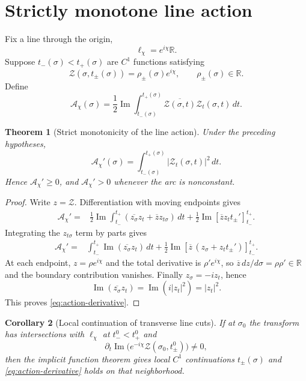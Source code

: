 \documentclass[11pt]{amsart}
\numberwithin{equation}{section}
\newtheorem{theorem}{Theorem}[section]
\newtheorem{corollary}[theorem]{Corollary}
\newcommand{\R}{\mathbb R}
\newcommand{\Zcal}{\mathcal Z}
\newcommand{\Acal}{\mathscr A}
\newcommand{\dd}{\,d}
\begin{document}
\section{Strictly monotone line action}

Fix a line through the origin,
\[
\ell_\chi=e^{i\chi}\R.
\]
Suppose $t_-(\sigma)<t_+(\sigma)$ are $C^1$ functions satisfying
\[
\Zcal(\sigma,t_\pm(\sigma))=\rho_\pm(\sigma)e^{i\chi},
\qquad \rho_\pm(\sigma)\in\R.
\]
Define
\begin{equation}
\boxed{
\Acal_\chi(\sigma)
=\frac12\operatorname{Im}
\int_{t_-(\sigma)}^{t_+(\sigma)}
\overline{\Zcal(\sigma,t)}\Zcal_t(\sigma,t)\dd t.
}
\label{eq:action}
\end{equation}

\begin{theorem}[Strict monotonicity of the line action]
Under the preceding hypotheses,
\begin{equation}
\boxed{
\Acal_\chi'(\sigma)
=
\int_{t_-(\sigma)}^{t_+(\sigma)}|\Zcal_t(\sigma,t)|^2\dd t.
}
\label{eq:action-derivative}
\end{equation}
Hence $\Acal_\chi'\ge0$, and $\Acal_\chi'>0$ whenever the arc is nonconstant.
\end{theorem}

\begin{proof}
Write $z=\Zcal$.  Differentiation with moving endpoints gives
\begin{align*}
\Acal_\chi'
={}&\frac12\operatorname{Im}\int_{t_-}^{t_+}
(\overline{z_\sigma}z_t+\overline z z_{t\sigma})\dd t
+\frac12\operatorname{Im}
\left[\overline z z_t t_\pm'\right]_{t_-}^{t_+}.
\end{align*}
Integrating the $z_{t\sigma}$ term by parts gives
\begin{align*}
\Acal_\chi'
={}&\int_{t_-}^{t_+}\operatorname{Im}(\overline{z_\sigma}z_t)\dd t
+\frac12\operatorname{Im}
\left[\overline z\,(z_\sigma+z_tt_\pm')\right]_{t_-}^{t_+}.
\end{align*}
At each endpoint, $z=\rho e^{i\chi}$ and the total derivative is $\rho'e^{i\chi}$, so $\overline z\,dz/d\sigma=\rho\rho'\in\R$ and the boundary contribution vanishes.  Finally $z_\sigma=-iz_t$, hence
\[
\operatorname{Im}(\overline{z_\sigma}z_t)
=\operatorname{Im}(i|z_t|^2)=|z_t|^2.
\]
This proves \eqref{eq:action-derivative}.
\end{proof}

\begin{corollary}[Local continuation of transverse line cuts]
If at $\sigma_0$ the transform has intersections with $\ell_\chi$ at $t_-^0<t_+^0$ and
\[
\partial_t\operatorname{Im}\bigl(e^{-i\chi}\Zcal(\sigma_0,t_\pm^0)\bigr)\ne0,
\]
then the implicit function theorem gives local $C^1$ continuations $t_\pm(\sigma)$ and \eqref{eq:action-derivative} holds on that neighborhood.
\end{corollary}
\end{document}
